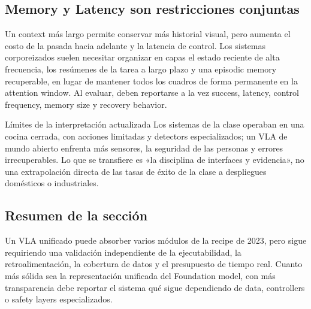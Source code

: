 \subsection{Memory y Latency son restricciones conjuntas}

Un context más largo permite conservar más historial visual, pero aumenta el costo de la pasada hacia adelante y la latencia de control. Los sistemas corporeizados suelen necesitar organizar en capas el estado reciente de alta frecuencia, los resúmenes de la tarea a largo plazo y una episodic memory recuperable, en lugar de mantener todos los cuadros de forma permanente en la attention window. Al evaluar, deben reportarse a la vez success, latency, control frequency, memory size y recovery behavior.

\begin{warningbox}{Límites de la interpretación actualizada}
Los sistemas de la clase operaban en una cocina cerrada, con acciones limitadas y detectors especializados; un VLA de mundo abierto enfrenta más sensores, la seguridad de las personas y errores irrecuperables. Lo que se transfiere es «la disciplina de interfaces y evidencia», no una extrapolación directa de las tasas de éxito de la clase a despliegues domésticos o industriales.
\end{warningbox}

\subsection{Resumen de la sección}

Un VLA unificado puede absorber varios módulos de la recipe de 2023, pero sigue requiriendo una validación independiente de la ejecutabilidad, la retroalimentación, la cobertura de datos y el presupuesto de tiempo real. Cuanto más sólida sea la representación unificada del Foundation model, con más transparencia debe reportar el sistema qué sigue dependiendo de data, controllers o safety layers especializados.
